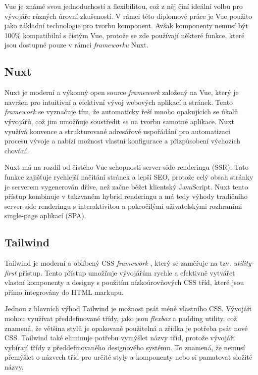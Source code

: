 Vue je známé svou jednoduchostí a flexibilitou, což z něj činí ideální volbu pro vývojáře různých úrovní zkušeností. V rámci této diplomové práce je Vue použito jako základní technologie pro tvorbu komponent. Avšak komponenty nemusí být 100\% kompatibilní s čistým Vue, protože se zde používají některé funkce, které jsou dostupné pouze v rámci \emph{frameworku} Nuxt.

\subsection{Nuxt}
Nuxt je moderní a výkonný open source \emph{framework} založený na Vue, který je navržen pro intuitivní a efektivní vývoj webových aplikací a stránek. Tento \emph{framework} se vyznačuje tím, že automaticky řeší mnoho opakujících se úkolů vývojářů, což jim umožňuje soustředit se na tvorbu samotné aplikace. Nuxt využívá konvence a strukturované adresářové uspořádání pro automatizaci procesu vývoje a nabízí možnost vlastní konfigurace a přizpůsobení výchozích chování.

Nuxt má na rozdíl od čistého Vue schopnosti server-side renderingu (SSR). Tato funkce zajišťuje rychlejší načítání stránek a lepší SEO, protože celý obsah stránky je serverem vygenerován dříve, než začne běžet klientský JavaScript. Nuxt tento přístup kombinuje v takzvaném hybrid renderingu a má tedy výhody tradičního server-side renderingu s interaktivitou a pokročilými uživatelskými rozhraními single-page aplikací (SPA). \cite{NuxtRenderingModes}

\subsection{Tailwind}
Tailwind je moderní a oblíbený CSS \emph{framework} \cite{StateOfCSS} \cite{StateOfFrontend}, který se zaměřuje na tzv. \emph{utility-first} přístup. Tento přístup umožňuje vývojářům rychle a efektivně vytvářet vlastní komponenty a designy s použitím nízkoúrovňových CSS tříd, které jsou přímo integrovány do HTML markupu.

Jednou z hlavních výhod Tailwind je možnost psát méně vlastního CSS. Vývojáři mohou využívat předdefinované třídy, jako jsou \emph{flexbox} a padding utility, což znamená, že většina stylů je opakovaně použitelná a zřídka je potřeba psát nové CSS. Tailwind také eliminuje potřebu vymýšlet názvy tříd, protože vývojáři vybírají třídy z předdefinovaného designového systému. To znamená, že nemusí přemýšlet o  názvech tříd pro určité styly a komponenty nebo si pamatovat složité názvy. \cite{TailwindUtilityFirst}

